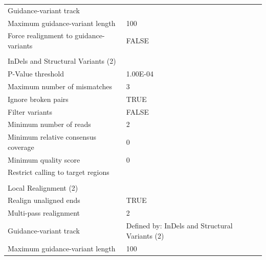 \begin{longtable}{ll}
Guidance-variant track                       &                                                \\
Maximum guidance-variant length              & 100                                            \\
Force realignment to guidance-variants       & FALSE                                          \\
                                             &                                                \\
InDels and Structural Variants (2)           &                                                \\
P-Value threshold                            & 1.00E-04                                       \\
Maximum number of mismatches                 & 3                                              \\
Ignore broken pairs                          & TRUE                                           \\
Filter variants                              & FALSE                                          \\
Minimum number of reads                      & 2                                              \\
Minimum relative consensus coverage          & 0                                              \\
Minimum quality score                        & 0                                              \\
Restrict calling to target regions           &                                                \\
                                             &                                                \\
Local Realignment (2)                        &                                                \\
Realign unaligned ends                       & TRUE                                           \\
Multi-pass realignment                       & 2                                              \\
Guidance-variant track                       & Defined by: InDels and Structural Variants (2) \\
Maximum guidance-variant length              & 100                                            \\

\end{longtable}
